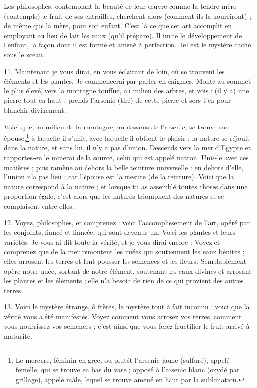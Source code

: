 \documentclass[a4paper, 11pt, oneside, polutonikogreek, french]{article}
\begin{document}
Les philosophes, contemplant la beauté de leur œuvre comme la tendre mère (contemple) le fruit de ses entrailles, cherchent alors (comment ils la nourriront) ; de même que la mère, pour son enfant. C'est là ce que cet art accomplit en employant au lieu de lait les eaux (qu'il prépare). Il imite le développement de l'enfant, la façon dont il est formé et amené à perfection. Tel est le mystère caché sous le sceau.

11. Maintenant je vous dirai, en vous éclairant de loin, où se trouvent les éléments et les plantes. Je commencerai par parler en énigmes. Monte au sommet le plus élevé, vers la montagne touffue, au milieu des arbres, et vois : (il y a) une pierre tout en haut ; prends l'arsenic (tiré) de cette pierre et sers-t'en pour blanchir divinement.

Voici que, au milieu de la montagne, au-dessous de l'arsenic, se trouve son épouse,\footnote{Le mercure, féminin en grec, ou plutôt l'arsenic jaune (sulfuré), appelé femelle, qui se trouve en bas du vase ; opposé à l'arsenic blanc (oxydé par grillage), appelé mâle, lequel se trouve amené en haut par la sublimation.} à laquelle il s'unit, avec laquelle il obtient le plaisir : la nature se réjouit dans la nature, et sans lui, il n'y a pas d'union. Descends vers la mer d'Egypte et rapportes-en le minerai de la source, celui qui est appelé natron. Unis-le avec ces matières ; puis ramène au dehors la belle teinture universelle : en dehors d'elle, l'union n'a pas lieu ; car l'épouse est la mesure (de la teinture). Voici que la nature correspond à la nature ; et lorsque tu as assemblé toutes choses dans une proportion égale, c'est alors que les natures triomphent des natures et se complaisent entre elles.

12. Voyez, philosophes, et comprenez : voici l'accomplissement de l'art, opéré par les conjoints, fiancé et fiancée, qui sont devenus un. Voici les plantes et leurs variétés. Je vous ai dit toute la vérité, et je vous dirai encore : Voyez et comprenez que de la mer remontent les nuées qui soutiennent les eaux bénites ; elles arrosent les terres et font pousser les semences et les fleurs. Semblablement opère notre nuée, sortant de notre élément, soutenant les eaux divines et arrosant les plantes et les éléments ; elle n'a besoin de rien de ce qui provient des autres terres.

13. Voici le mystère étrange, ô frères, le mystère tout à fait inconnu ; voici que la vérité vous a été manifestée. Voyez comment vous arrosez vos terres, comment vous nourrissez vos semences ; c'est ainsi que vous ferez fructifier le fruit arrivé à maturité.
\end{document}

